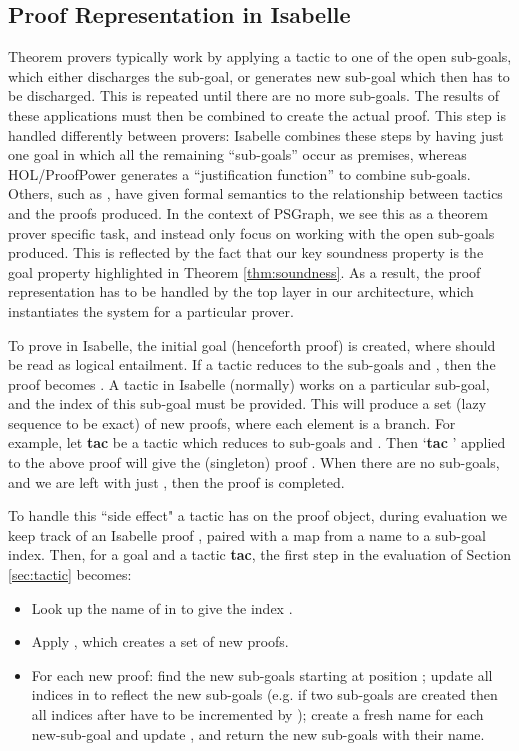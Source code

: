 \documentclass{llncs}
\begin{document}
\beforesection
\subsection{Proof Representation in Isabelle}
\aftersection

Theorem provers typically work by applying a tactic to one of the open sub-goals,
which either discharges the sub-goal, or generates new sub-goal which then has to
be discharged. This is repeated until there are no more sub-goals. The results of these applications must then be combined to create the actual proof. This step is handled
differently between provers: Isabelle combines these steps by having just one goal in which all the remaining ``sub-goals'' occur as premises, whereas HOL/ProofPower generates a ``justification function'' to combine sub-goals. Others, such as \cite{paper:Aspinall:2008,paper:Whiteside:11,Stampoulis10},
have given formal semantics to the relationship between tactics and 
the proofs produced. In the context of PSGraph, we see this as a theorem prover
specific task, and instead only focus on working with the open sub-goals produced. 
This is reflected by the fact that our key soundness property is the goal property highlighted in 
Theorem \ref{thm:soundness}. As a result, the proof representation has to be handled by the top layer in our architecture,
which instantiates the system for a particular prover.

To prove  in Isabelle, the initial goal (henceforth proof) 
 is 
created, where  should be read as logical entailment.
If a tactic reduces  to the sub-goals  and , then the proof  
becomes . A tactic in Isabelle (normally) works on a particular sub-goal, and the index of this sub-goal must be provided. This will produce a set (lazy sequence to be exact) of new proofs, where each element is a branch. For example, let \textbf{tac} be a tactic which reduces  to sub-goals  and . Then `\textbf{tac} ' applied to the above proof will give the (singleton) proof . When there are no sub-goals,
and we are left with just , then the proof is completed. 

To handle this ``side effect" a tactic has on the proof object, during evaluation we keep track of an Isabelle proof , paired with a map  from a name to a sub-goal index. Then, for a goal  and a tactic \textbf{tac},
the first step in the evaluation of Section \ref{sec:tactic} becomes:
\begin{itemize}
\item Look up the name of  in  to give the index .
\item Apply , which creates a set of new proofs.
\item For each new proof: find the new sub-goals starting at position ; update all indices in  to reflect the new sub-goals (e.g. if two sub-goals are created then all indices after  have to be incremented by ); create a fresh name for each new-sub-goal and update , and return the new sub-goals with their name.
\end{itemize}
\end{document}

